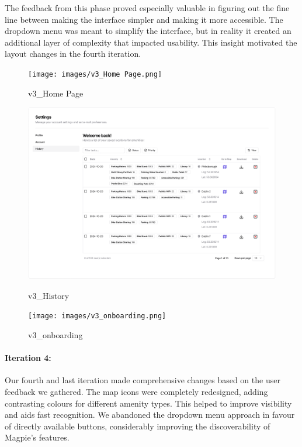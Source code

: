 The feedback from this phase proved especially valuable in figuring out the
fine line between making the interface simpler and making it more accessible.
The dropdown menu was meant to simplify the interface, but in reality it created
an additional layer of complexity that impacted usability. This insight motivated 
the layout changes in the fourth iteration.

\begin{figure}[htbp]
    \centering
    \begin{minipage}{0.32\textwidth}
        \centering
        \texttt{[image: images/v3\_Home Page.png]}
        \caption{v3\_Home Page}
        \label{fig:v3_Home Page}
    \end{minipage}
    \hfill
    \begin{minipage}{0.32\textwidth}
        \centering
        \includegraphics[width=\textwidth]{images/v3_History.png}
        \caption{v3\_History}
        \label{fig:v3_History}
    \end{minipage}
    \hfill
    \begin{minipage}{0.32\textwidth}
        \centering
        \texttt{[image: images/v3\_onboarding.png]}
        \caption{v3\_onboarding}
        \label{fig:v3_onboarding}
    \end{minipage}

\end{figure}

\paragraph{Iteration 4:}
Our fourth and last iteration made comprehensive changes based on the user 
feedback we gathered. The map icons were completely redesigned, adding contrasting 
colours for different amenity types. This helped to improve visibility and aids fast 
recognition. We abandoned the dropdown menu approach in favour of directly available
buttons, considerably improving the discoverability of Magpie's features.

